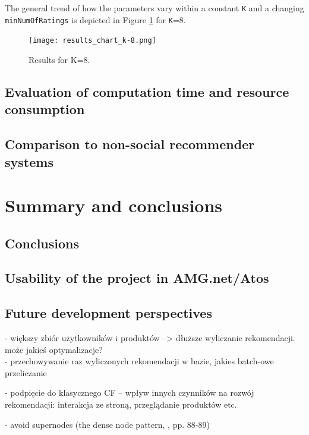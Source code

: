 \documentclass[12pt]{report}
\begin{document}
The general trend of how the parameters vary within a constant \texttt{K} and a changing \texttt{minNumOfRatings} is depicted in Figure \ref{fig.results_chart_k-8} for \texttt{K}=8.

\begin{figure}[!h]
\centering
\texttt{[image: results\_chart\_k-8.png]} 
\caption[Results for K=8.]{Results for K=8.}
\label{fig.results_chart_k-8}
\end{figure}

\section{Evaluation of computation time and resource consumption}
\section{Comparison to non-social recommender systems}

\chapter{Summary and conclusions}
\section{Conclusions}
\section{Usability of the project in AMG.net/Atos}
\section{Future development perspectives}

- większy zbiór użytkowników i produktów --> dłuższe wyliczanie rekomendacji. może jakieś optymalizacje?\\

- przechowywanie raz wyliczonych rekomendacji w bazie, jakies batch-owe przeliczanie

- podpięcie do klasycznego CF
-- wpływ innych czynników na rozwój rekomendacji: interakcja ze stroną, przeglądanie produktów etc.

- avoid supernodes (the dense node pattern, \cite{learning_neo4j}, pp. 88-89)

\end{document}
